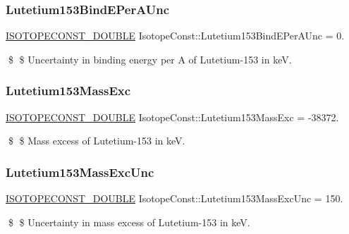 \subsubsection{\texorpdfstring{Lutetium153\+Bind\+E\+Per\+A\+Unc}{Lutetium153BindEPerAUnc}}
{\footnotesize\ttfamily \mbox{\hyperlink{group___isotope_const-_macros_ga8f45a7272ce02c0b4c65c44636ed719a}{I\+S\+O\+T\+O\+P\+E\+C\+O\+N\+S\+T\+\_\+\+D\+O\+U\+B\+LE}} Isotope\+Const\+::\+Lutetium153\+Bind\+E\+Per\+A\+Unc = 0.}

\$ \$ Uncertainty in binding energy per A of Lutetium-\/153 in keV. \mbox{\label{group___isotope_const-_lutetium-_lu153_ga31677a529e40785b96c5662b88539abc}} 
\subsubsection{\texorpdfstring{Lutetium153\+Mass\+Exc}{Lutetium153MassExc}}
{\footnotesize\ttfamily \mbox{\hyperlink{group___isotope_const-_macros_ga8f45a7272ce02c0b4c65c44636ed719a}{I\+S\+O\+T\+O\+P\+E\+C\+O\+N\+S\+T\+\_\+\+D\+O\+U\+B\+LE}} Isotope\+Const\+::\+Lutetium153\+Mass\+Exc = -\/38372.}

\$ \$ Mass excess of Lutetium-\/153 in keV. \mbox{\label{group___isotope_const-_lutetium-_lu153_ga3c1365dd438dbe935268b3ad89d819e5}} 
\subsubsection{\texorpdfstring{Lutetium153\+Mass\+Exc\+Unc}{Lutetium153MassExcUnc}}
{\footnotesize\ttfamily \mbox{\hyperlink{group___isotope_const-_macros_ga8f45a7272ce02c0b4c65c44636ed719a}{I\+S\+O\+T\+O\+P\+E\+C\+O\+N\+S\+T\+\_\+\+D\+O\+U\+B\+LE}} Isotope\+Const\+::\+Lutetium153\+Mass\+Exc\+Unc = 150.}

\$ \$ Uncertainty in mass excess of Lutetium-\/153 in keV. \mbox{\label{group___isotope_const-_lutetium-_lu153_gaa663595eba1bd7dd656af914dbfc992e}} 
